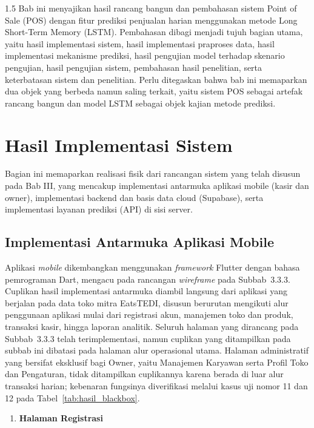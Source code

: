\documentclass[12pt, a4paper, onecolumn, oneside]{report}
\begin{document}
\begin{spacing}{1.5}
Bab ini menyajikan hasil rancang bangun dan pembahasan sistem Point of Sale (POS) dengan fitur prediksi penjualan harian menggunakan metode Long Short-Term Memory (LSTM). Pembahasan dibagi menjadi tujuh bagian utama, yaitu hasil implementasi sistem, hasil implementasi praproses data, hasil implementasi mekanisme prediksi, hasil pengujian model terhadap skenario pengujian, hasil pengujian sistem, pembahasan hasil penelitian, serta keterbatasan sistem dan penelitian. Perlu ditegaskan bahwa bab ini memaparkan dua objek yang berbeda namun saling terkait, yaitu sistem POS sebagai artefak rancang bangun dan model LSTM sebagai objek kajian metode prediksi.

\section{Hasil Implementasi Sistem}

Bagian ini memaparkan realisasi fisik dari rancangan sistem yang telah disusun pada Bab III, yang mencakup implementasi antarmuka aplikasi mobile (kasir dan owner), implementasi backend dan basis data cloud (Supabase), serta implementasi layanan prediksi (API) di sisi server.

\subsection{Implementasi Antarmuka Aplikasi Mobile}

Aplikasi \textit{mobile} dikembangkan menggunakan \textit{framework} Flutter dengan bahasa pemrograman Dart, mengacu pada rancangan \textit{wireframe} pada Subbab~3.3.3. Cuplikan hasil implementasi antarmuka diambil langsung dari aplikasi yang berjalan pada data toko mitra EatsTEDI, disusun berurutan mengikuti alur penggunaan aplikasi mulai dari registrasi akun, manajemen toko dan produk, transaksi kasir, hingga laporan analitik. Seluruh halaman yang dirancang pada Subbab~3.3.3 telah terimplementasi, namun cuplikan yang ditampilkan pada subbab ini dibatasi pada halaman alur operasional utama. Halaman administratif yang bersifat eksklusif bagi Owner, yaitu Manajemen Karyawan serta Profil Toko dan Pengaturan, tidak ditampilkan cuplikannya karena berada di luar alur transaksi harian; kebenaran fungsinya diverifikasi melalui kasus uji nomor 11 dan 12 pada Tabel~\ref{tab:hasil_blackbox}.

\begin{enumerate}
    \item \textbf{Halaman Registrasi}


\end{enumerate}
\end{spacing}
\end{document}
